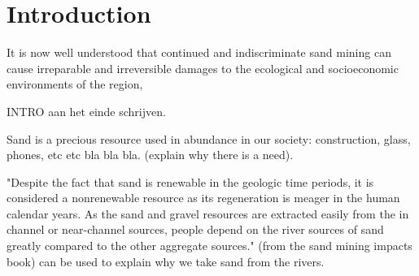 \chapter{Introduction}
\label{chapter:introduction}

It is now well understood that continued and indiscriminate sand mining can cause irreparable and irreversible damages to the ecological and socioeconomic environments of the region,

INTRO aan het einde schrijven.

Sand is a precious resource used in abundance in our society: construction, glass, phones, etc etc bla bla bla. (explain why there is a need).


"Despite the fact that sand is renewable in the geologic time periods, it is considered a nonrenewable resource as its regeneration is meager in the human calendar years. As the sand and gravel resources are extracted easily from the in channel or near-channel sources, people depend on the river sources of sand greatly compared to the other aggregate sources."
(from the sand mining impacts book)
can be used to explain why we take sand from the rivers.

